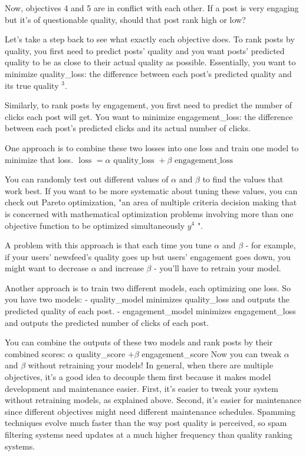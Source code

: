\documentclass[openany]{book}
\begin{document}
Now, objectives 4 and 5 are in conflict with each other. If a post is very engaging but it's of questionable quality, should that post rank high or low?

Let's take a step back to see what exactly each objective does. To rank posts by quality, you first need to predict posts' quality and you want posts' predicted quality to be as close to their actual quality as possible. Essentially, you want to minimize quality\_loss: the difference between each post's predicted quality and its true quality ${ }^3$.

Similarly, to rank posts by engagement, you first need to predict the number of clicks each post will get. You want to minimize engagement\_loss: the difference between each post's predicted clicks and its actual number of clicks.

One approach is to combine these two losses into one loss and train one model to minimize that loss.
$\text { loss }=\alpha \text { quality\_loss }+\beta \text { engagement\_loss }$

You can randomly test out different values of $\alpha$ and $\beta$ to find the values that work best. If you want to be more systematic about tuning these values, you can check out Pareto optimization, "an area of multiple criteria decision making that is concerned with mathematical optimization problems involving more than one objective function to be optimized simultaneously $y^4$ ".

A problem with this approach is that each time you tune $\alpha$ and $\beta$ - for example, if your users' newsfeed's quality goes up but users' engagement goes down, you might want to decrease $\alpha$ and increase $\beta$ - you'll have to retrain your model.

Another approach is to train two different models, each optimizing one loss. So you have two models:
- quality\_model minimizes quality\_loss and outputs the predicted quality of each post.
- engagement_model minimizes engagement\_loss and outputs the predicted number of clicks of each post.

You can combine the outputs of these two models and rank posts by their combined scores: $\alpha$ quality\_score $+\beta$ engagement\_score
Now you can tweak $\alpha$ and $\beta$ without retraining your models!
In general, when there are multiple objectives, it's a good idea to decouple them first because it makes model development and maintenance easier. First, it's easier to tweak your system without retraining models, as explained above. Second, it's easier for maintenance since different objectives might need different maintenance schedules. Spamming techniques evolve much faster than the way post quality is perceived, so spam filtering systems need updates at a much higher frequency than quality ranking systems.
\end{document}
